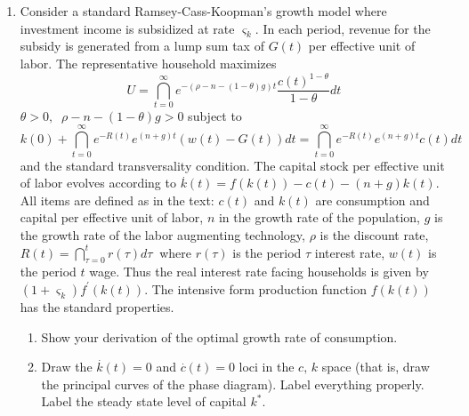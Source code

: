 \documentclass[12pt]{article}
\begin{document}
\begin{enumerate}
\item Consider a standard Ramsey-Cass-Koopman's growth model where
investment income is subsidized at rate $\varsigma _{k}.$ In each period,
revenue for the subsidy is generated from a lump sum tax of $G\left(
t\right) $ per effective unit of labor. The representative household
maximizes 
\begin{equation*}
U=\dint\limits_{t=0}^{\infty }e^{-\left( \rho -n-\left( 1-\theta \right)
g\right) t}\frac{c\left( t\right) ^{1-\theta }}{1-\theta }dt
\end{equation*}%
$\theta >0,$ $\ \rho -n-\left( 1-\theta \right) g>0$ subject to%
\begin{equation*}
k\left( 0\right) +\dint\limits_{t=0}^{\infty }e^{-R\left( t\right)
}e^{\left( n+g\right) t}\left( w\left( t\right) -G\left( t\right) \right)
dt=\dint\limits_{t=0}^{\infty }e^{-R\left( t\right) }e^{\left( n+g\right)
t}c\left( t\right) dt
\end{equation*}%
and the standard transversality condition. The capital stock per effective
unit of labor evolves according to $\overset{.}{k}\left( t\right) =f\left(
k\left( t\right) \right) -c\left( t\right) -\left( n+g\right) k\left(
t\right) .$ All items are defined as in the text: $c\left( t\right) $ and $%
k\left( t\right) $ are consumption and capital per effective unit of labor, $%
n$ in the growth rate of the population, $g$ is the growth rate of the labor
augmenting technology, $\rho $ is the discount rate, $R\left( t\right)
=\dint\limits_{\tau =0}^{t}r\left( \tau \right) d\tau $ $\ $where $r\left(
\tau \right) $ is the period $\tau $ interest rate, $w\left( t\right) $ is
the period $t$ wage. Thus the real interest rate facing households is given
by $\left( 1+\varsigma _{k}\right) f^{\prime }\left( k\left( t\right)
\right) .$ The intensive form production function $f\left( k\left( t\right)
\right) $ has the standard properties.

\begin{enumerate}
\item Show your derivation of the optimal growth rate of consumption.

\item Draw the $\overset{.}{k}\left( t\right) =0$ and $\overset{.}{c}\left(
t\right) =0$ loci in the $c,\,k$ space (that is, draw the principal curves
of the phase diagram). Label everything properly. Label the steady state
level of capital $k^{\ast }.$


\end{enumerate}
\end{enumerate}
\end{document}
